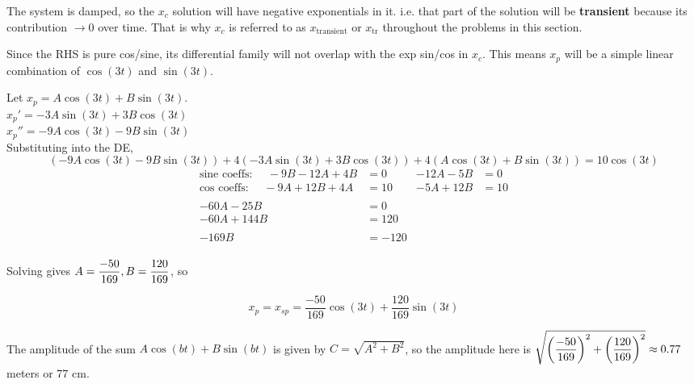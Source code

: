 \begin{enumerate}
\begin{Solution}
  The system is damped, so the $x_c$ solution will have negative
  exponentials in it. i.e. that part of the solution will be {\bf
    transient} because its contribution $\to 0$ over time.  That is
  why $x_c$ is referred to as $x_{\mbox{transient}}$ or
  $x_{\mbox{tr}}$ throughout the problems in this section.

  Since the RHS is pure cos/sine, its differential family will not
  overlap with the exp sin/cos in $x_c$.  This means $x_p$ will be a
  simple linear combination of $\cos(3t)$ and $\sin(3t)$.

Let $x_p = A \cos(3t) + B \sin(3t)$. \\
$x_p' = -3A \sin(3t) + 3B \cos(3t)$ \\
$x_p'' = -9A \cos(3t) - 9B \sin(3t)$ \\

Substituting into the DE,
$$ ( -9A \cos(3t) - 9B \sin(3t))
+4( -3A \sin(3t) + 3B \cos(3t))
+4(A \cos(3t) + B \sin(3t))  = 10 \cos(3t)$$ 
\begin{align*}
\mbox{sine coeffs: ~~~} -9B-12A+4B & = 0 & -12A -5B &= 0 \\
\mbox{cos coeffs: ~~~} -9A+12B+4A & = 10 & -5A + 12B &= 10\\
\\
-60A -25B & = 0 \\
-60A + 144 B &= 120 \\
\\
 -169B &= -120 \\
\end{align*}


Solving gives $\displaystyle A = \frac{-50}{169}, B = \frac{120}{169}$, so 

$$x_p = x_{sp} = \frac{-50}{169} \cos(3t) + \frac{120}{169} \sin(3t)$$

The amplitude of the sum $A \cos(bt) + B \sin(bt)$ is given by $C =
\sqrt{A^2 + B^2}$, so the amplitude here is $\displaystyle \sqrt{
  \left(\frac{-50}{169}\right)^2 + \left(\frac{120}{169}\right)^2}
\approx 0.77$ meters or 77 cm.

\end{Solution}
\end{enumerate}






